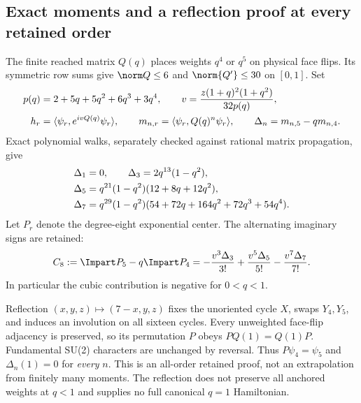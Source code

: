 \subsection{Exact moments and a reflection proof at every retained order}
The finite reached matrix $Q(q)$ places weights $q^4$ or $q^5$ on physical face flips. Its symmetric row sums give $\norm Q\le6$ and $\norm{Q'}\le30$ on $[0,1]$. Set
\begin{align}
 p(q)&=2+5q+5q^2+6q^3+3q^4,\qquad
 v=\frac{z(1+q)^2(1+q^2)}{32p(q)},\notag\\
 h_r&=\langle\psi_r,e^{ivQ(q)}\psi_r\rangle,\qquad
 m_{n,r}=\langle\psi_r,Q(q)^n\psi_r\rangle,\qquad
 \Delta_n=m_{n,5}-q m_{n,4}.
 \label{r28:eq:ai3-moments}
\end{align}
Exact polynomial walks, separately checked against rational matrix propagation, give
\begin{align}
 \Delta_1&=0,\qquad \Delta_3=2q^{13}(1-q^2),\notag\\
 \Delta_5&=q^{21}(1-q^2)(12+8q+12q^2),\notag\\
 \Delta_7&=q^{29}(1-q^2)(54+72q+164q^2+72q^3+54q^4).
 \label{r28:eq:ai3-exact-deltas}
\end{align}
Let $P_r$ denote the degree-eight exponential center. The alternating imaginary signs are retained:
\begin{equation}
 C_8:=\Impart P_5-q\Impart P_4
 =-\frac{v^3\Delta_3}{3!}+\frac{v^5\Delta_5}{5!}
 -\frac{v^7\Delta_7}{7!}.
 \label{r28:eq:ai3-combination}
\end{equation}
In particular the cubic contribution is negative for $0<q<1$.

Reflection $(x,y,z)\mapsto(7-x,y,z)$ fixes the unoriented cycle $X$, swaps $Y_4,Y_5$, and induces an involution on all sixteen cycles. Every unweighted face-flip adjacency is preserved, so its permutation $P$ obeys $PQ(1)=Q(1)P$. Fundamental SU(2) characters are unchanged by reversal. Thus $P\psi_4=\psi_5$ and $\Delta_n(1)=0$ for \emph{every} $n$. This is an all-order retained proof, not an extrapolation from finitely many moments. The reflection does not preserve all anchored weights at $q<1$ and supplies no full canonical $q=1$ Hamiltonian.

